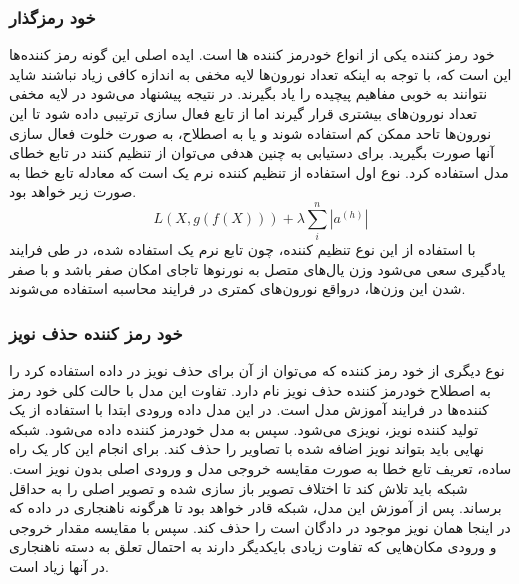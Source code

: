 \documentclass[12pt,a4paper]{report}
\theoremstyle{definition}
\theoremstyle{definition}
\begin{document}
\subsubsection{خود رمزگذار }
خود رمز کننده  یکی از انواع خودرمز کننده ها است. ایده اصلی این گونه رمز کننده‌ها این است که، با توجه به اینکه تعداد نورون‌ها لایه مخفی به اندازه کافی زیاد نباشند شاید نتوانند به خوبی مفاهیم پیچیده را یاد بگیرند. در نتیجه پیشنهاد می‌شود در لایه مخفی تعداد نورون‌های بیشتری قرار گیرند اما از تابع فعال سازی ترتیبی داده شود تا این نورون‌ها تاحد ممکن کم استفاده شوند و یا به اصطلاح، به صورت خلوت فعال سازی آنها صورت بگیرید. برای دستیابی به چنین هدفی می‌توان از تنظیم کنند در تابع خطای مدل استفاده کرد. نوع اول استفاده از تنظیم کننده نرم یک است که معادله تابع خطا به صورت زیر خواهد بود.
\begin{equation}
L(X, g(f(X))) + \lambda \sum_{i}^{n}|a^{(h)}|
\end{equation}
با استفاده از این نوع تنظیم کننده، چون تابع نرم یک استفاده شده، در طی فرایند یادگیری سعی می‌شود وزن یال‌های متصل به نورنو‌ها تاجای امکان صفر باشد و با صفر شدن این وزن‌ها، درواقع نورون‌های کمتری در فرایند محاسبه استفاده می‌شوند. 

\subsubsection{خود رمز کننده حذف نویز}
نوع دیگری از خود رمز کننده که می‌توان از آن برای حذف نویز در داده استفاده کرد را به اصطلاح خودرمز کننده حذف نویز نام دارد. تفاوت این مدل با حالت کلی خود رمز کننده‌ها در فرایند آموزش مدل است. در این مدل داده ورودی ابتدا با استفاده از یک تولید کننده نویز، نویزی می‌شود. سپس به مدل خودرمز کننده داده می‌شود. شبکه نهایی باید بتواند نویز اضافه شده با تصاویر را حذف کند. برای انجام این کار یک راه ساده، تعریف تابع خطا به صورت مقایسه خروجی مدل و ورودی اصلی بدون نویز است. شبکه باید تلاش کند تا اختلاف تصویر باز سازی شده و تصویر اصلی را به حداقل برساند. پس از آموزش این مدل، شبکه قادر خواهد بود تا هرگونه ناهنجاری در داده که در اینجا همان نویز موجود در دادگان است را حذف کند. سپس با مقایسه مقدار خروجی و ورودی مکان‌هایی که تفاوت زیادی بایکدیگر دارند به احتمال تعلق به دسته ناهنجاری در آنها زیاد است.
\end{document}
